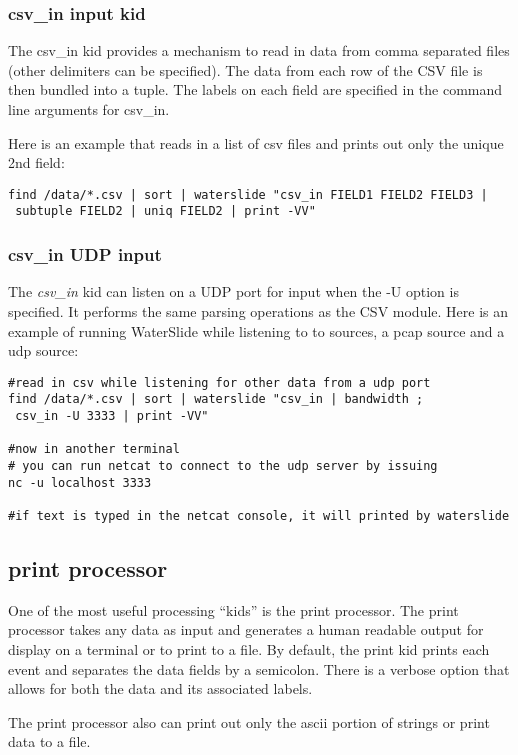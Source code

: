 \documentclass[11pt]{article}
\begin{document}
\subsubsection{csv\_in input kid}
The csv\_in kid provides a mechanism to read in data from comma separated files
(other delimiters can be specified).  The data from each row of the CSV file is then bundled into a tuple.  The labels on each
field are specified in the command line arguments for csv\_in.

Here is an example that reads in a list of csv files and prints out only the unique 2nd field: 

\begin{lstlisting}
find /data/*.csv | sort | waterslide "csv_in FIELD1 FIELD2 FIELD3 |
 subtuple FIELD2 | uniq FIELD2 | print -VV"
\end{lstlisting}

\subsubsection{csv\_in UDP input}
The \emph{csv\_in} kid can listen on a UDP port for input when the -U option is specified. 
It performs the same parsing operations
as the CSV module.  Here is an example of running WaterSlide while listening to to sources, a pcap
source and a udp source:

\begin{lstlisting}
#read in csv while listening for other data from a udp port
find /data/*.csv | sort | waterslide "csv_in | bandwidth ;
 csv_in -U 3333 | print -VV"

#now in another terminal
# you can run netcat to connect to the udp server by issuing
nc -u localhost 3333

#if text is typed in the netcat console, it will printed by waterslide
\end{lstlisting}

\subsection{print processor}
One of the most useful processing ``kids'' is the print processor.  The print processor takes any
data as input and generates a human readable output for display on a terminal or to print to a file.
By default, the print kid prints each event and separates the data fields by a semicolon.  There is a
verbose option that allows for both the data and its associated labels.  

The print processor also can print out only the ascii portion of strings or print data to a file.
\end{document}
